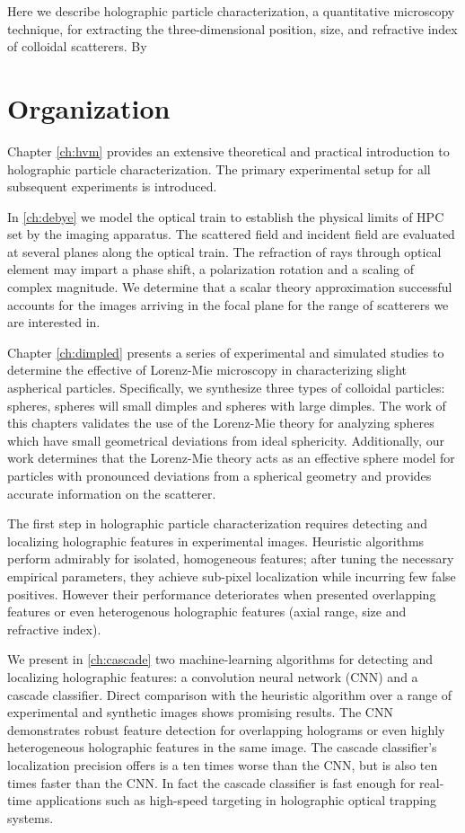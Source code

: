 Here we describe holographic particle characterization,
a quantitative microscopy technique, for extracting
the three-dimensional position, size, and refractive index of
colloidal scatterers. By 

\section{Organization}

Chapter \ref{ch:hvm} provides an extensive theoretical and practical
introduction to holographic particle characterization. The primary
experimental setup for all subsequent experiments is introduced.

In \autoref{ch:debye} we model the optical train to establish the
physical limits of HPC set by the imaging apparatus. The scattered
field and incident field are evaluated at several planes along the
optical train. The refraction of rays through optical element
may impart a phase shift, a polarization rotation and a scaling
of complex magnitude. We determine that a scalar theory
approximation successful accounts for the images arriving in the
focal plane for the range of scatterers we are interested in.

Chapter \ref{ch:dimpled} presents a series of experimental and
simulated studies to determine the effective of Lorenz-Mie
microscopy in characterizing slight aspherical particles.
Specifically, we synthesize three types of colloidal particles:
spheres, spheres will small dimples and spheres with large dimples.
The work of this chapters validates the use of the Lorenz-Mie theory
for analyzing spheres which have small geometrical deviations from
ideal sphericity. Additionally, our work determines that the Lorenz-Mie
theory acts as an effective sphere model for particles with
pronounced deviations from a spherical geometry and provides
accurate information on the scatterer.

The first step in holographic particle characterization
requires detecting and localizing holographic features in experimental
images. Heuristic algorithms perform admirably for isolated, homogeneous
features; after tuning the necessary empirical parameters, they achieve
sub-pixel localization while incurring few false positives. However their
performance deteriorates when presented overlapping features or even
heterogenous holographic features (axial range, size and refractive index).

We present in \autoref{ch:cascade} two machine-learning algorithms for
detecting and localizing holographic features: a convolution
neural network (CNN) and a cascade classifier. Direct comparison with the
heuristic algorithm over a range of experimental and synthetic images
shows promising results. The CNN demonstrates robust feature detection
for overlapping holograms or even highly heterogeneous holographic features
in the same image. The cascade classifier's localization precision
offers is a ten times worse than the CNN, but is also ten times faster than
the CNN. In fact the cascade classifier is fast enough for real-time
applications such as high-speed targeting in holographic optical
trapping systems.

